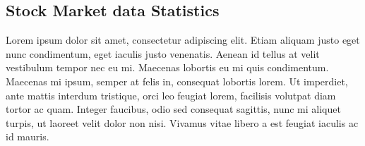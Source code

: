 \documentclass[11pt,a4paper]{article}
\begin{document}
\subsection{Stock Market data Statistics}
Lorem ipsum dolor sit amet, consectetur adipiscing elit. Etiam aliquam justo eget nunc condimentum, eget iaculis justo venenatis. Aenean id tellus at velit vestibulum tempor nec eu mi. Maecenas lobortis eu mi quis condimentum. Maecenas mi ipsum, semper at felis in, consequat lobortis lorem. Ut imperdiet, ante mattis interdum tristique, orci leo feugiat lorem, facilisis volutpat diam tortor ac quam. Integer faucibus, odio sed consequat sagittis, nunc mi aliquet turpis, ut laoreet velit dolor non nisi. Vivamus vitae libero a est feugiat iaculis ac id mauris.
\end{document}
